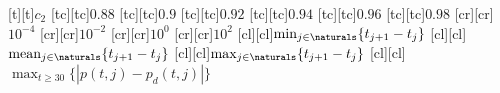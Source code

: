 [t][t]{\small $c_2$}
[tc][tc]{\small $0.88$}
[tc][tc]{\small $0.9$}
[tc][tc]{\small $0.92$}
[tc][tc]{\small $0.94$}
[tc][tc]{\small $0.96$}
[tc][tc]{\small $0.98$}
[cr][cr]{\small $10^{-4}$}
[cr][cr]{\small $10^{-2}$}
[cr][cr]{\small $10^{0}$}
[cr][cr]{\small $10^{2}$}
[cl][cl]{\small $\min_{j\in\naturals}\{t_{j+1}-t_j\}$}
[cl][cl]{\small $\mathrm{mean}_{j\in\naturals}\{t_{j+1}-t_j\}$}
[cl][cl]{\small $\max_{j\in\naturals}\{t_{j+1}-t_j\}$}
[cl][cl]{\small $\max_{t\geq 30}\{|p(t,j)-p_d(t,j)|\}$}
